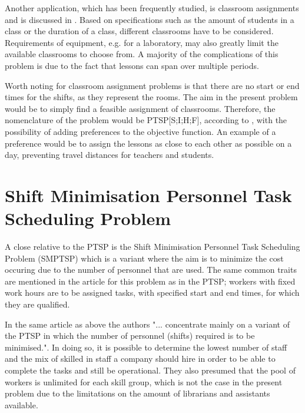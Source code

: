 Another application, which has been frequently studied, is classroom assignments and is discussed in \citet{krishnamoorthy_2001}. Based on specifications such as the amount of students in a class or the duration of a class, different classrooms have to be considered. Requirements of equipment, e.g. for a laboratory, may also greatly limit the available classrooms to choose from. A majority of the complications of this problem is due to the fact that lessons can span over multiple periods. 

Worth noting for classroom assignment problems is that there are no start or end times for the shifts, as they represent the rooms. The aim in the present problem would be to simply find a feasible assignment of classrooms. Therefore, the nomenclature of the problem would be PTSP[S;I;H;F], according to \citet{krishnamoorthy_2001}, with the possibility of adding preferences to the objective function. An example of a preference would be to assign the lessons as close to each other as possible on a day, preventing travel distances for teachers and students.



%
%



\section{Shift Minimisation Personnel Task Scheduling Problem}\label{SMTSP}
A close relative to the PTSP is the Shift Minimisation Personnel Task Scheduling Problem (SMPTSP) which is a variant where the aim is to minimize the cost occuring due to the number of personnel that are used. The same common traits are mentioned in the article \citet{krishnamoorthy_2012} for this problem as in the PTSP; workers with fixed work hours are to be assigned tasks, with specified start and end times, for which they are qualified.

In the same article as above the authors "... concentrate mainly on a variant of the PTSP in which the number of personnel (shifts) required is to be minimised.". In doing so, it is possible to determine the lowest number of staff and the mix of skilled in staff a company should hire in order to be able to complete the tasks and still be operational. They also presumed that the pool of workers is unlimited for each skill group, which is not the case in the present problem due to the limitations on the amount of librarians and assistants available. 

